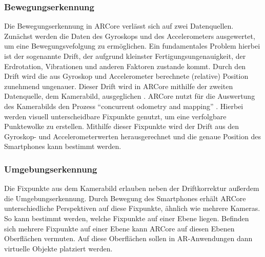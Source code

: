 \documentclass[10pt]{scrartcl}
\begin{document}
\subsubsection{Bewegungserkennung}
Die Bewegungserkennung in ARCore verlässt sich auf zwei Datenquellen. Zunächst werden die Daten des Gyroskops und des Accelerometers ausgewertet, um eine Bewegungsvefolgung zu ermöglichen. Ein fundamentales Problem hierbei ist der sogenannte Drift, der aufgrund kleinster Fertigungsungenauigkeit, der Erdrotation, Vibrationen und anderen Faktoren zustande kommt. Durch den Drift wird die aus Gyroskop und Accelerometer berechnete (relative) Position zunehmend ungenauer. Dieser Drift wird in ARCore mithilfe der zweiten Datenquelle, dem Kamerabild, ausgeglichen \cite[vgl.][]{krempelarcoretango}. ARCore nutzt für die Auswertung des Kamerabilds den Prozess \enquote{concurrent odometry and mapping} \cite{arcoreconcepts2018}. Hierbei werden visuell unterscheidbare Fixpunkte genutzt, um eine verfolgbare Punktewolke zu erstellen. Mithilfe dieser Fixpunkte wird der Drift aus den Gyroskop- und Accelerometerwerten herausgerechnet und die genaue Position des Smartphones kann bestimmt werden.

\subsubsection{Umgebungserkennung}
Die Fixpunkte aus dem Kamerabild erlauben neben der Driftkorrektur außerdem die Umgebungserkennung. Durch Bewegung des Smartphones erhält ARCore unterschiedliche Perspektiven auf diese Fixpunkte, ähnlich wie mehrere Kameras. So kann bestimmt werden, welche Fixpunkte auf einer Ebene liegen. Befinden sich mehrere Fixpunkte auf einer Ebene kann ARCore auf diesen Ebenen Oberflächen vermuten. Auf diese Oberflächen sollen in AR-Anwendungen dann virtuelle Objekte platziert werden.
\end{document}

